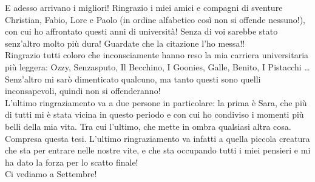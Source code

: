 E adesso arrivano i migliori!
Ringrazio i miei amici e compagni di sventure Christian, Fabio, Lore e Paolo (in ordine alfabetico cos\`i non si offende nessuno!), con cui ho affrontato questi anni di universit\`a! 
Senza di voi sarebbe stato senz'altro molto pi\`u dura! Guardate che la citazione l'ho messa!!\\
Ringrazio tutti coloro che inconsciamente hanno reso la mia carriera universitaria pi\`u leggera:
Ozzy, Senzasputo, Il Becchino, I Goonies, Galle, Benito, I Pistacchi \dots Senz'altro mi sar\`o dimenticato qualcuno, ma tanto questi sono quelli inconsapevoli, quindi non si offenderanno!\\

L'ultimo ringraziamento va a due persone in particolare:
la prima \`e Sara, che pi\`u di tutti mi \`e stata vicina in questo periodo e con cui ho condiviso i momenti pi\`u belli della mia vita.
Tra cui l'ultimo, che mette in ombra qualsiasi altra cosa. Compresa questa tesi.
L'ultimo ringraziamento va infatti a quella piccola creatura che sta per entrare nelle nostre vite, e che sta occupando tutti i miei pensieri e mi ha dato la forza per lo scatto finale!\\
Ci vediamo a Settembre!

